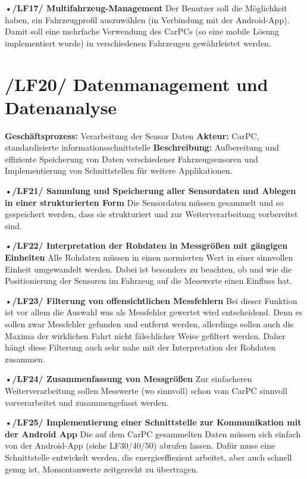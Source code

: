 \textbf{•/LF17/ Multifahrzeug-Management}
\nextline
Der Benutzer soll die Möglichkeit haben, ein Fahrzeugprofil auszuwählen (in Verbindung mit der Android-App). Damit soll eine mehrfache Verwendung des CarPCs (so eine mobile Lösung implementiert wurde) in verschiedenen Fahrzeugen gewährleistet werden.
\newpage

\section{/LF20/ Datenmanagement und Datenanalyse}
\textbf{Geschäftsprozess:}	Verarbeitung der Sensor Daten
\newline
\textbf{Akteur:}		CarPC, standardisierte informationsschnittstelle
\newline
\textbf{Beschreibung:} Aufbereitung und effiziente Speicherung von Daten verschiedener Fahrzeugsensoren und Implementierung von Schnittstellen für weitere Applikationen. 

\textbf{•/LF21/ Sammlung und Speicherung aller Sensordaten und Ablegen in einer strukturierten Form}
\nextline
Die Sensordaten müssen gesammelt und so gespeichert werden, dass sie strukturiert und zur Weiterverarbeitung vorbereitet sind.

\textbf{•/LF22/ Interpretation der Rohdaten in Messgrößen mit gängigen Einheiten}
\nextline
Alle Rohdaten müssen in einen normierten Wert in einer sinnvollen Einheit umgewandelt werden. Dabei ist besonders zu beachten, ob und wie die Positionierung der Sensoren im Fahrzeug auf die Messwerte einen Einfluss hat.

\textbf{•/LF23/ Filterung von offensichtlichen Messfehlern}
\nextline
Bei dieser Funktion ist vor allem die Auswahl was als Messfehler gewertet wird entscheidend. Denn es sollen zwar Messfehler gefunden und entfernt werden, allerdings sollen auch die Maxima der wirklichen Fahrt nicht fälschlicher Weise gefiltert werden. Daher hängt diese Filterung auch sehr nahe mit der Interpretation der Rohdaten zusammen.

\textbf{•/LF24/ Zusammenfassung von Messgrößen}
\nextline
Zur einfacheren Weiterverarbeitung sollen Messwerte (wo sinnvoll) schon vom CarPC sinnvoll vorverarbeitet und zusammengefasst werden.

\textbf{•/LF25/ Implementierung einer Schnittstelle zur Kommunikation mit der Android App}
\nextline
Die auf dem CarPC gesammelten Daten müssen sich einfach von der Android-App (siehe LF30/40/50) abrufen lassen. Dafür muss eine Schnittstelle entwickelt werden, die energieeffiezient arbeitet, aber auch schnell genug ist, Momentanwerte zeitgerecht zu übertragen.
\newpage

